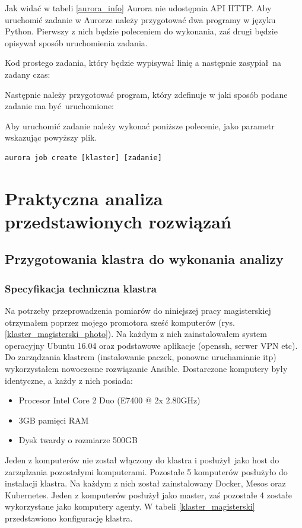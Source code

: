 \documentclass[10pt,a4paper,titlepage,twoside]{report}
\begin{document}
Jak widać w tabeli \ref{aurora_info} Aurora nie udostępnia API HTTP. Aby uruchomić zadanie w Aurorze należy przygotować dwa programy w języku Python. Pierwszy z nich będzie poleceniem do wykonania, zaś drugi będzie opisywał sposób uruchomienia zadania.

Kod prostego zadania, który będzie wypisywał linię a następnie zasypiał na zadany czas:


Następnie należy przygotować program, który zdefinuje w jaki sposób podane zadanie ma być uruchomione:


Aby uruchomić zadanie należy wykonać poniższe polecenie, jako parametr wskazując powyższy plik.
\begin{lstlisting}
aurora job create [klaster] [zadanie]
\end{lstlisting}

\onehalfspacing
\chapter{Praktyczna analiza przedstawionych rozwiązań}
\section{Przygotowania klastra do wykonania analizy}
\subsection{Specyfikacja techniczna klastra}
Na potrzeby przeprowadzenia pomiarów do niniejszej pracy magisterskiej otrzymałem poprzez mojego promotora sześć komputerów (rys. \ref{klaster_magisterski_photo}). Na każdym z nich zainstalowałem system operacyjny Ubuntu 16.04 oraz podstawowe aplikacje (openssh, serwer VPN etc). Do zarządzania klastrem (instalowanie paczek, ponowne uruchamianie itp) wykorzystałem nowoczesne rozwiązanie Ansible. Dostarczone komputery były identyczne, a każdy z nich posiada:
\begin{itemize}
\item Procesor Intel Core 2 Duo (E7400 @ 2x 2.80GHz)
\item 3GB pamięci RAM
\item Dysk twardy o rozmiarze 500GB
\end{itemize}

Jeden z komputerów nie został włączony do klastra i posłużył jako host do zarządzania pozostałymi komputerami. Pozostałe 5 komputerów posłużyło do instalacji klastra. Na każdym z nich został zainstalowany Docker, Mesos oraz Kubernetes. Jeden z komputerów posłużył jako master, zaś pozostałe 4 zostałe wykorzystane jako komputery agenty. W tabeli \ref{klaster_magisterski} przedstawiono konfigurację klastra.
\end{document}
